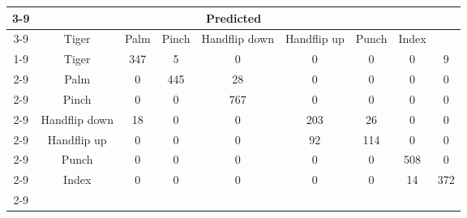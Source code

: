 \documentclass{standalone}
\begin{document}
 
 \begin{tabular}{|c |c |c |c |c |c |c |c |c |}
\cline{3-9}\multicolumn{2}{c|}{} & \multicolumn{7}{c|}{Predicted} \\ 
\cline{3-9} \multicolumn{2}{c |}{ } & Tiger & Palm & Pinch & Handflip down & Handflip up & Punch & Index\\ 
\cline{1-9}\multirow{7}{*}{\rotatebox[origin=c]{90}{Actual}} & Tiger & 347 & 5 & 0 & 0 & 0 & 0 & 9\\ 
 \cline{2-9} & Palm & 0 & 445 & 28 & 0 & 0 & 0 & 0\\ 
 \cline{2-9} & Pinch & 0 & 0 & 767 & 0 & 0 & 0 & 0\\ 
 \cline{2-9} & Handflip down & 18 & 0 & 0 & 203 & 26 & 0 & 0\\ 
 \cline{2-9} & Handflip up & 0 & 0 & 0 & 92 & 114 & 0 & 0\\ 
 \cline{2-9} & Punch & 0 & 0 & 0 & 0 & 0 & 508 & 0\\ 
 \cline{2-9} & Index & 0 & 0 & 0 & 0 & 0 & 14 & 372\\ 
 \cline{2-9}\hline \end{tabular}
 
\end{document}
